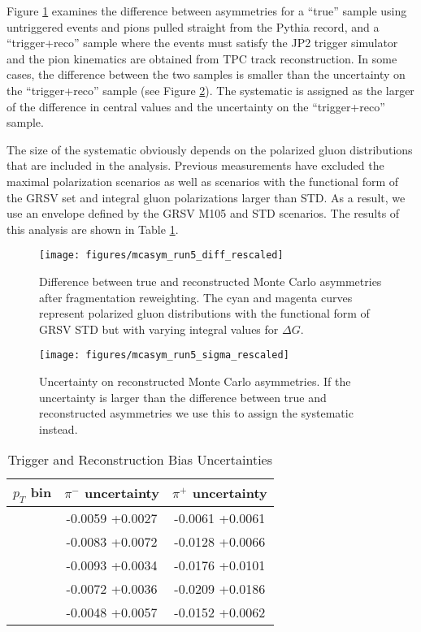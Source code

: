 Figure \ref{fig:mcasym-diff} examines the difference between asymmetries for a
``true'' sample using untriggered events and pions pulled straight from the
Pythia record, and a ``trigger+reco'' sample where the events must satisfy the
JP2 trigger simulator and the pion kinematics are obtained from TPC track
reconstruction. In some cases, the difference between the two samples is smaller
than the uncertainty on the ``trigger+reco'' sample (see Figure
\ref{fig:mcasym-sigma}). The systematic is assigned as the larger of the
difference in central values and the uncertainty on the ``trigger+reco'' sample.

The size of the systematic obviously depends on the polarized gluon
distributions that are included in the analysis. Previous measurements have
excluded the maximal polarization scenarios as well as scenarios with the
functional form of the GRSV set and integral gluon polarizations larger than
STD. As a result, we use an envelope defined by the GRSV M105 and STD
scenarios. The results of this analysis are shown in Table
\ref{tbl:trig-reco-bias}.

\begin{figure}
  \texttt{[image: figures/mcasym\_run5\_diff\_rescaled]}
  \caption{Difference between true and reconstructed Monte Carlo
  asymmetries after fragmentation reweighting.  The cyan and magenta curves represent polarized gluon distributions with the functional form of GRSV STD but with varying integral values for $\Delta G$.}
  \label{fig:mcasym-diff}
\end{figure}

\begin{figure}
  \texttt{[image: figures/mcasym\_run5\_sigma\_rescaled]}
  \caption{Uncertainty on reconstructed Monte Carlo asymmetries. If the
  uncertainty is larger than the difference between true and reconstructed
  asymmetries we use this to assign the systematic instead.}
  \label{fig:mcasym-sigma}
\end{figure}

\begin{table}[ht]
    \begin{center}
        \begin{tabular}{c|c|c}
        \hline
        $p_{T}$ bin & $\pi^{-}$ uncertainty & $\pi^{+}$ uncertainty\\
        \hline
        \hline
        [2.00 - 3.18] & -0.0059 +0.0027 & -0.0061 +0.0061\\
        \hline
        [3.18 - 4.56] & -0.0083 +0.0072 & -0.0128 +0.0066\\
        \hline
        [4.56 - 6.32] & -0.0093 +0.0034 & -0.0176 +0.0101\\
        \hline
        [6.32 - 8.80] & -0.0072 +0.0036 & -0.0209 +0.0186\\
        \hline
        [8.80 - 12.84] & -0.0048 +0.0057 & -0.0152 +0.0062\\
    \hline
    \end{tabular}
    \end{center}
    \caption{Trigger and Reconstruction Bias Uncertainties}
    \label{tbl:trig-reco-bias}
\end{table}
